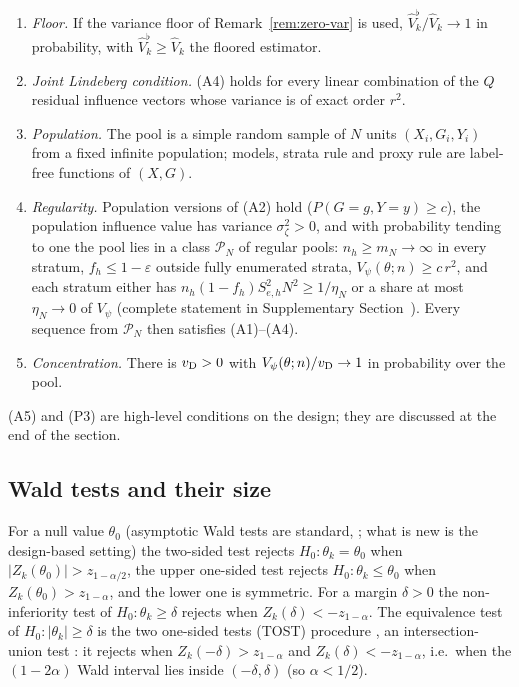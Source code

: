 \begin{assumption}\label{ass:testing}
\begin{enumerate}
\item[(A5)] \emph{Floor.} If the variance floor of Remark~\ref{rem:zero-var} is used, $\hat V_k^{\flat}/\hat V_k\to1$ in probability, with $\hat V_k^\flat\ge\hat V_k$ the floored estimator.
\item[(A4$_Q$)] \emph{Joint Lindeberg condition.} (A4) holds for every linear combination of the $Q$ residual influence vectors whose variance is of exact order $r^2$.
\item[(P1)] \emph{Population.} The pool is a simple random sample of $N$ units $(X_i,G_i,Y_i)$ from a fixed infinite population; models, strata rule and proxy rule are label-free functions of $(X,G)$.
\item[(P2)] \emph{Regularity.} Population versions of (A2) hold ($P(G=g,Y=y)\ge c$), the population influence value has variance $\sigma^2_\zeta>0$, and with probability tending to one the pool lies in a class $\mathcal P_N$ of regular pools: $n_h\ge m_N\to\infty$ in every stratum, $f_h\le1-\varepsilon$ outside fully enumerated strata, $V_\psi(\theta;n)\ge c\,r^2$, and each stratum either has $n_h(1-f_h)S^2_{e,h}N^2\ge1/\eta_N$ or a share at most $\eta_N\to0$ of $V_\psi$ (complete statement in Supplementary Section~). Every sequence from $\mathcal P_N$ then satisfies (A1)--(A4).
\item[(P3)] \emph{Concentration.} There is $v_{\rm D}>0$ with $V_\psi(\theta;n)/v_{\rm D}\to1$ in probability over the pool.
\end{enumerate}
\end{assumption}

(A5) and (P3) are high-level conditions on the design; they are discussed at the end of the section.

\subsection{Wald tests and their size}\label{sec:test-size}

For a null value $\theta_0$ (asymptotic Wald tests are standard, \citealt[Ch.~11]{lehmann2005}; what is new is the design-based setting) the two-sided test rejects $H_0:\theta_k=\theta_0$ when $|Z_k(\theta_0)|>z_{1-\alpha/2}$, the upper one-sided test rejects $H_0:\theta_k\le\theta_0$ when $Z_k(\theta_0)>z_{1-\alpha}$, and the lower one is symmetric. For a margin $\delta>0$ the non-inferiority test of $H_0:\theta_k\ge\delta$ rejects when $Z_k(\delta)<-z_{1-\alpha}$. The equivalence test of $H_0:|\theta_k|\ge\delta$ is the two one-sided tests (TOST) procedure \citep{schuirmann1987,wellek2010}, an intersection-union test \citep{berger1982,berger1996}: it rejects when $Z_k(-\delta)>z_{1-\alpha}$ and $Z_k(\delta)<-z_{1-\alpha}$, i.e.\ when the $(1-2\alpha)$ Wald interval lies inside $(-\delta,\delta)$ (so $\alpha<1/2$).

